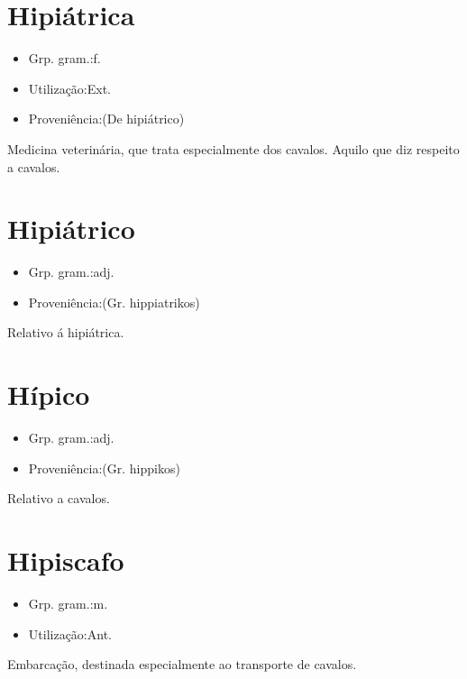 \documentclass{article}
\begin{document}
\section{Hipiátrica}
\begin{itemize}
\item {Grp. gram.:f.}
\end{itemize}
\begin{itemize}
\item {Utilização:Ext.}
\end{itemize}
\begin{itemize}
\item {Proveniência:(De \textunderscore hipiátrico\textunderscore )}
\end{itemize}
Medicina veterinária, que trata especialmente dos cavalos.
Aquilo que diz respeito a cavalos.
\section{Hipiátrico}
\begin{itemize}
\item {Grp. gram.:adj.}
\end{itemize}
\begin{itemize}
\item {Proveniência:(Gr. \textunderscore hippiatrikos\textunderscore )}
\end{itemize}
Relativo á hipiátrica.
\section{Hípico}
\begin{itemize}
\item {Grp. gram.:adj.}
\end{itemize}
\begin{itemize}
\item {Proveniência:(Gr. \textunderscore hippikos\textunderscore )}
\end{itemize}
Relativo a cavalos.
\section{Hipiscafo}
\begin{itemize}
\item {Grp. gram.:m.}
\end{itemize}
\begin{itemize}
\item {Utilização:Ant.}
\end{itemize}
Embarcação, destinada especialmente ao transporte de cavalos.
\end{document}
